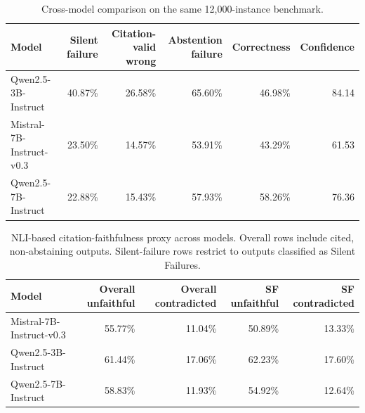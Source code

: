 \begin{table}[t]
\centering
\caption{Cross-model comparison on the same 12,000-instance benchmark.}
\label{tab:model-comparison}
\begin{tabular}{lrrrrr}
\toprule
Model & Silent failure & Citation-valid wrong & Abstention failure & Correctness & Confidence \\
\midrule
Qwen2.5-3B-Instruct & 40.87\% & 26.58\% & 65.60\% & 46.98\% & 84.14 \\
Mistral-7B-Instruct-v0.3 & 23.50\% & 14.57\% & 53.91\% & 43.29\% & 61.53 \\
Qwen2.5-7B-Instruct & 22.88\% & 15.43\% & 57.93\% & 58.26\% & 76.36 \\
\bottomrule
\end{tabular}
\end{table}

\begin{table}[t]
\centering
\caption{NLI-based citation-faithfulness proxy across models. Overall rows include cited, non-abstaining outputs. Silent-failure rows restrict to outputs classified as Silent Failures.}
\label{tab:citation-faithfulness}
\begin{tabular}{lrrrr}
\toprule
Model & Overall unfaithful & Overall contradicted & SF unfaithful & SF contradicted \\
\midrule
Mistral-7B-Instruct-v0.3 & 55.77\% & 11.04\% & 50.89\% & 13.33\% \\
Qwen2.5-3B-Instruct & 61.44\% & 17.06\% & 62.23\% & 17.60\% \\
Qwen2.5-7B-Instruct & 58.83\% & 11.93\% & 54.92\% & 12.64\% \\
\bottomrule
\end{tabular}
\end{table}